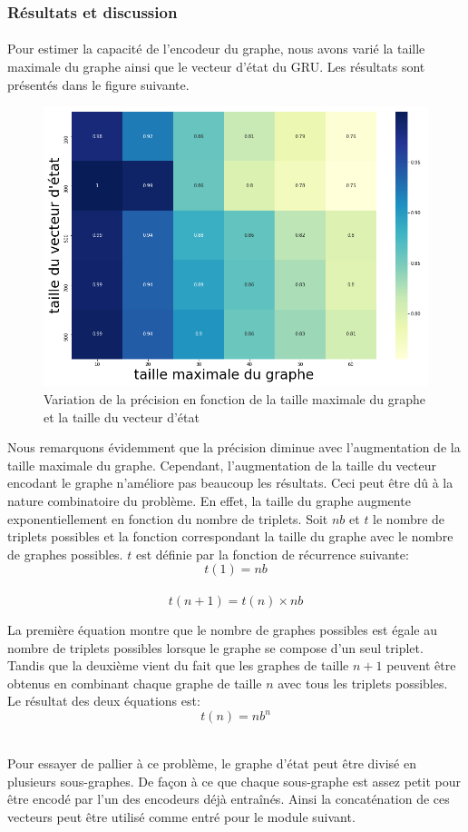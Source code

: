 \subsubsection{Résultats et discussion}
\paragraph{}Pour estimer la capacité de l'encodeur du graphe, nous avons varié la taille maximale du graphe ainsi que le vecteur d'état du GRU. Les résultats sont présentés dans le figure suivante.
\begin{figure}[H] 
	\centering
	\includegraphics[width=0.95\linewidth]{images/Realisation/DM/heatmap.png}
	\caption{Variation de la précision en fonction de la taille maximale du graphe et la taille du vecteur d'état}\label{heatmap}
\end{figure}
\par Nous remarquons évidemment que la précision diminue avec l'augmentation de la taille maximale du graphe. Cependant, l'augmentation de la taille du vecteur encodant le graphe n'améliore pas beaucoup les résultats. Ceci peut être dû à la nature combinatoire du problème. En effet, la taille du graphe augmente exponentiellement en fonction du nombre de triplets. Soit $nb$ et $t$ le nombre de triplets possibles et la fonction correspondant la taille du graphe avec le nombre de graphes possibles. $t$ est définie par la fonction de récurrence suivante:
\[t(1) = nb\]\\
\[t(n+1) = t(n) \times nb\]
\par La première équation montre que le nombre de graphes possibles est égale au nombre de triplets possibles lorsque le graphe se compose d'un seul triplet. Tandis que la deuxième vient du fait que les graphes de taille $n+1$ peuvent être obtenus en combinant chaque graphe de taille $n$ avec tous les triplets possibles. Le résultat des deux équations est:
\[t(n) = nb^n\]\\
\par Pour essayer de pallier à ce problème, le graphe d'état peut être divisé en plusieurs sous-graphes. De façon à ce que chaque sous-graphe est assez petit pour être encodé par l'un des encodeurs déjà entraînés. Ainsi la concaténation de ces vecteurs peut être utilisé comme entré pour le module suivant.
